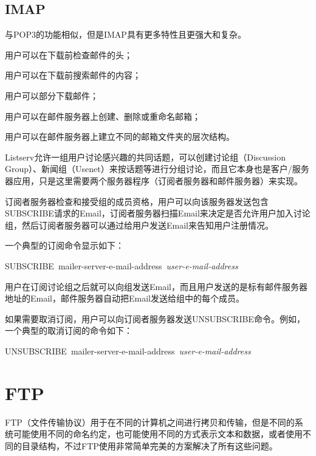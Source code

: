 \section{IMAP}

与POP3的功能相似，但是IMAP具有更多特性且更强大和复杂。

\begin{compactitem}
\item 用户可以在下载前检查邮件的头；
\item 用户可以在下载前搜索邮件的内容；
\item 用户可以部分下载邮件；
\item 用户可以在邮件服务器上创建、删除或重命名邮箱；
\item 用户可以在邮件服务器上建立不同的邮箱文件夹的层次结构。
\end{compactitem}


Listserv允许一组用户讨论感兴趣的共同话题，可以创建讨论组（Discussion Group）、新闻组（Usenet）来按话题等进行分组讨论，而且它本身也是客户/服务器应用，只是这里需要两个服务器程序（订阅者服务器和邮件服务器）来实现。



订阅者服务器检查和接受组的成员资格，用户可以向该服务器发送包含SUBSCRIBE请求的Email，订阅者服务器扫描Email来决定是否允许用户加入讨论组，然后订阅者服务器可以通过给用户发送Email来告知用户注册情况。

一个典型的订阅命令显示如下：
\begin{center}
SUBSCRIBE~mailer-server-e-mail-address~\textit{user-e-mail-address}
\end{center}

用户在订阅讨论组之后就可以向组发送Email，而且用户发送的是标有邮件服务器地址的Email，邮件服务器自动把Email发送给组中的每个成员。

如果需要取消订阅，用户可以向订阅者服务器发送UNSUBSCRIBE命令。例如，一个典型的取消订阅的命令如下：
\begin{center}
UNSUBSCRIBE~mailer-server-e-mail-address~\textit{user-e-mail-address}
\end{center}



\chapter{FTP}


FTP（文件传输协议）用于在不同的计算机之间进行拷贝和传输，但是不同的系统可能使用不同的命名约定，也可能使用不同的方式表示文本和数据，或者使用不同的目录结构，不过FTP使用非常简单完美的方案解决了所有这些问题。

